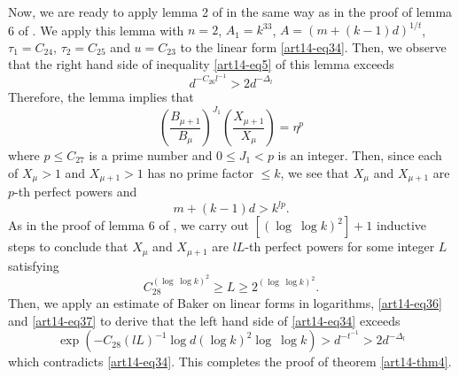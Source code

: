 Now, we are ready to apply lemma 2 of \cite{art14-key24} in the same way as in the proof of lemma 6 of \cite{art14-key24}. We apply this lemma with $n=2$, $A_{1}=k^{33}$, $A=(m+(k-1)d)^{1/t}$, $\tau_{1}=C_{24}$, $\tau_{2}=C_{25}$ and $u=C_{23}$ to the linear form \eqref{art14-eq34}. Then, we observe that the right hand side of inequality \eqref{art14-eq5} of this lemma exceeds
$$
d^{-C_{26}l^{-1}}>2d^{-\Delta_{l}}
$$
Therefore, the lemma implies that
$$
\left(\frac{B_{\mu+1}}{B_{\mu}}\right)^{J_{1}}\left(\frac{X_{\mu+1}}{X_{\mu}}\right)=\eta^{p}
$$
where $p\leq C_{27}$ is a prime number and $0\leq J_{1}<p$ is an integer. Then, since each of $X_{\mu}>1$ and $X_{\mu+1}>1$ has no prime factor $\leq k$, we see that $X_{\mu}$ and $X_{\mu+1}$ are $p$-th perfect powers and
$$
m+(k-1)d>k^{lp}.
$$
As in the proof of lemma 6 of \cite{art14-key24}, we carry out $[(\log \ \log k)^{2}]+1$ inductive steps to conclude that $X_{\mu}$ and $X_{\mu+1}$ are $lL$-th perfect powers for some integer $L$ satisfying
\begin{equation}
C_{28}^{(\log \ \log k)^{2}}\geq L\geq 2^{(\log \ \log k)^{2}}.\label{art14-eq37}
\end{equation}
Then, we apply an estimate of Baker \cite{art14-key3} on linear forms in logarithms, \eqref{art14-eq36} and \eqref{art14-eq37} to derive that the left hand side of \eqref{art14-eq34} exceeds
$$
\exp (-C_{28}(lL)^{-1}\log d(\log k)^{2}\log \ \log k)>d^{-t^{-1}}>2d^{-\Delta_{l}}
$$
which contradicts \eqref{art14-eq34}. This completes the proof of theorem \ref{art14-thm4}.

